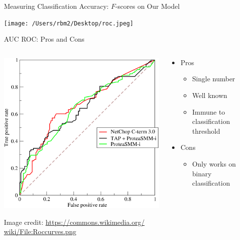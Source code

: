 \documentclass[aspectratio=169]{beamer}
\begin{document}
\begin{frame}{Measuring Classification Accuracy: $F$-scores on Our Model}

    \texttt{[image: /Users/rbm2/Desktop/roc.jpeg]}
\end{frame}
\begin{frame}{AUC ROC: Pros and Cons}

\begin{columns}
\begin{column}{0.5\textwidth}
    \includegraphics[width=1\textwidth]{lectSup/Roccurves} %

   
   \vspace{-1em}
    {\tiny Image credit: \url{https://commons.wikimedia.org/
    wiki/File:Roccurves.png}}

\end{column}
\begin{column}{0.5\textwidth}

\begin{itemize}
	\item Pros
		\begin{itemize}
		\item Single number
		\item Well known
		\item Immune to classification threshold
		\end{itemize}
	\item Cons
		\begin{itemize}
		\item Only works on binary classification
		\end{itemize}
	\end{itemize}
\end{column}
\end{columns}
\end{frame}
\end{document}
